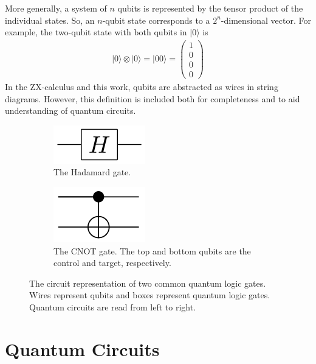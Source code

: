 More generally, a system of $n$ qubits is represented by the tensor product of the individual states.
So, an $n$-qubit state corresponds to a $2^{n}$-dimensional vector.
For example, the two-qubit state with both qubits in $|0\rangle$ is
\begin{align*}
  |0\rangle \otimes |0\rangle = |00\rangle = \begin{pmatrix}1 \\ 0 \\ 0 \\ 0\end{pmatrix}
\end{align*}
In the ZX-calculus and this work, qubits are abstracted as wires in string diagrams.
However, this definition is included both for completeness and to aid understanding of quantum circuits.

\begin{figure}
\centering
\begin{subfigure}{.5\textwidth}
  \centering
  \includegraphics[width=.4\linewidth]{img/had}
  \caption{The Hadamard gate.}
  \label{fig:had}
\end{subfigure}%
\begin{subfigure}{.5\textwidth}
  \centering
  \includegraphics[width=.4\linewidth]{img/cnot}
  \caption{The CNOT gate. The top and bottom qubits are the control and target, respectively.}
  \label{fig:cnot}
\end{subfigure}
\caption{
  The circuit representation of two common quantum logic gates.
  Wires represent qubits and boxes represent quantum logic gates.
  Quantum circuits are read from left to right.
}
\label{fig:test}
\end{figure}


\section{Quantum Circuits}\label{sec:qcircs}

